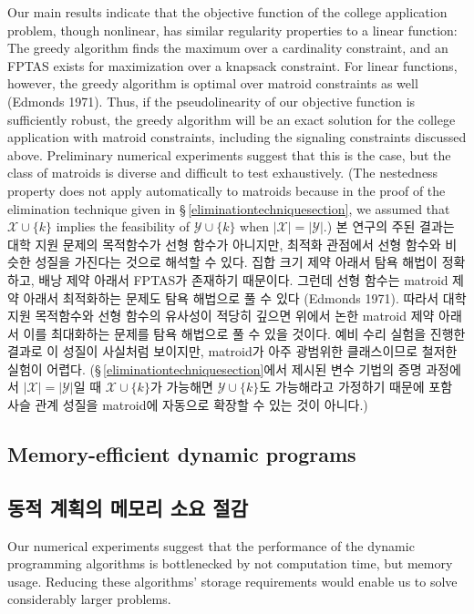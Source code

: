 \documentclass[11pt]{article} %
\theoremstyle{definition}
\theoremstyle{definition}
\begin{document}
\ifen 
Our main results indicate that the objective function of the college application problem, though nonlinear, has similar regularity properties to a linear function: The greedy algorithm finds the maximum over a cardinality constraint, and an FPTAS exists for maximization over a knapsack constraint. For linear functions, however, the greedy algorithm is optimal over matroid constraints as well (Edmonds 1971). Thus, if the pseudolinearity of our objective function is sufficiently robust, the greedy algorithm will be an exact solution for the college application with matroid constraints, including the signaling constraints discussed above. Preliminary numerical experiments suggest that this is the case, but the class of matroids is diverse and difficult to test exhaustively. (The nestedness property does not apply automatically to matroids because in the proof of the elimination technique given in \S\,\ref{eliminationtechniquesection}, we assumed that $\mathcal{X} \cup \{k\}$ implies the feasibility of $\mathcal{Y} \cup \{k\}$ when $|\mathcal{X}| = |\mathcal{Y}|$.)
\else
본 연구의 주된 결과는 대학 지원 문제의 목적함수가 선형 함수가 아니지만, 최적화 관점에서 선형 함수와 비슷한 성질을 가진다는 것으로 해석할 수 있다. 집합 크기 제약 아래서 탐욕 해법이 정확하고, 배낭 제약 아래서 FPTAS가 존재하기 때문이다. 그런데 선형 함수는 matroid 제약 아래서 최적화하는 문제도 탐욕 해법으로 풀 수 있다 (Edmonds 1971). 따라서 대학 지원 목적함수와 선형 함수의 유사성이 적당히 깊으면 위에서 논한 matroid 제약 아래서 이를 최대화하는 문제를 탐욕 해법으로 풀 수 있을 것이다. 예비 수리 실험을 진행한 결과로 이 성질이 사실처럼 보이지만, matroid가 아주 광범위한 클래스이므로 철저한 실험이 어렵다. (\S\,\ref{eliminationtechniquesection}에서 제시된 변수 기법의 증명 과정에서 $|\mathcal{X}| = |\mathcal{Y}|$일 때 $\mathcal{X} \cup \{k\}$가 가능해면 $\mathcal{Y} \cup \{k\}$도 가능해라고 가정하기 때문에 포함 사슬 관계 성질을 matroid에 자동으로 확장할 수 있는 것이 아니다.)
\fi



\ifen \subsection{Memory-efficient dynamic programs}\else \subsection{동적 계획의 메모리 소요 절감}\fi
\ifen
Our numerical experiments suggest that the performance of the dynamic programming algorithms is bottlenecked by not computation time, but memory usage. Reducing these algorithms' storage requirements would enable us to solve considerably larger problems.
\end{document}
